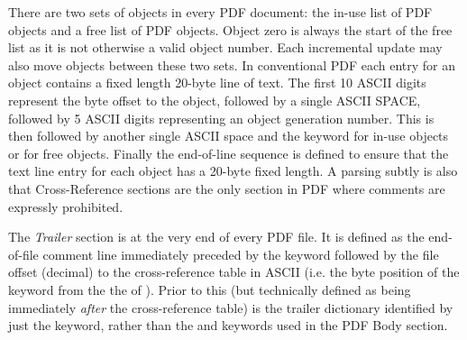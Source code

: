 There are two sets of
objects in every PDF document: the in-use list of PDF objects and a free list
of PDF objects. Object zero is always the start of the free list as it is not
otherwise a valid object number. Each incremental update may also move objects between these two sets.
In conventional PDF each entry for an object contains a fixed length 20-byte line of text.
The first 10 ASCII digits represent the byte offset to the object, followed by a single ASCII SPACE, 
followed by 5 ASCII digits representing an object generation number. This is then followed by
another single ASCII space and the keyword  for in-use objects or  for free objects.
Finally the end-of-line sequence is defined to ensure that the text line entry for each object has 
a 20-byte fixed length. A parsing subtly is also that Cross-Reference sections are the only section in PDF where comments are expressly prohibited.

The \emph{Trailer} section is at the very end of every PDF file. 
It is defined as the end-of-file comment line  immediately
preceded by the  keyword followed by the file offset (decimal) to 
the cross-reference table in ASCII (i.e. the byte position of the  keyword 
from the the \lstcd{\%} of ). Prior to this (but technically 
defined as being immediately \emph{after} the cross-reference table) is the trailer dictionary
identified by just the  keyword, rather than the  and 
keywords used in the PDF Body section.

